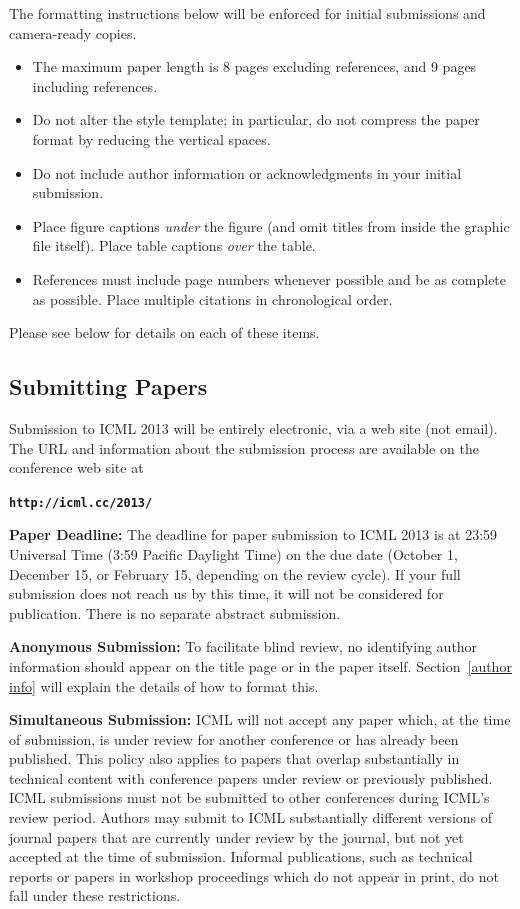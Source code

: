 \documentclass{article}
\begin{document}
The formatting instructions below will be enforced for initial submissions and camera-ready copies. 
\begin{itemize}
\item The maximum paper length is 8 pages excluding references, and 
9 pages including references.
\item Do not alter the style template; in particular, do not compress the paper format 
by reducing the vertical spaces.
\item Do not include author information or acknowledgments in your
  initial submission. 
\item Place figure captions {\em under} the figure (and omit titles from
  inside the graphic file itself).  Place table captions {\em over}
  the table.
\item References must include page numbers whenever possible and be as
  complete as possible.  Place multiple citations in chronological order.  
\end{itemize}
Please see below for details on each of these items.

\subsection{Submitting Papers}

Submission to ICML 2013 will be entirely electronic, via a web site
(not email).  The URL and information about the submission process
are available on the conference web site at

\textbf{\texttt{http://icml.cc/2013/}}

{\bf Paper Deadline:} The deadline for paper submission to ICML 2013
is at 23:59 Universal Time (3:59 Pacific Daylight Time) on the due date
(October 1, December 15, or February 15, depending on the review cycle).  
If your full submission does not reach us by this time, it will 
not be considered for publication. There is no separate abstract submission.

{\bf Anonymous Submission:} To facilitate blind review, no identifying
author information should appear on the title page or in the paper
itself.  Section~\ref{author info} will explain the details of how to
format this.

{\bf Simultaneous Submission:} ICML will not accept any paper which,
at the time of submission, is under review for another conference or
has already been published. This policy also applies to papers that
overlap substantially in technical content with conference papers
under review or previously published. ICML submissions must not be
submitted to other conferences during ICML's review period. Authors
may submit to ICML substantially different versions of journal papers
that are currently under review by the journal, but not yet accepted
at the time of submission. Informal publications, such as technical
reports or papers in workshop proceedings which do not appear in
print, do not fall under these restrictions.
\end{document}
